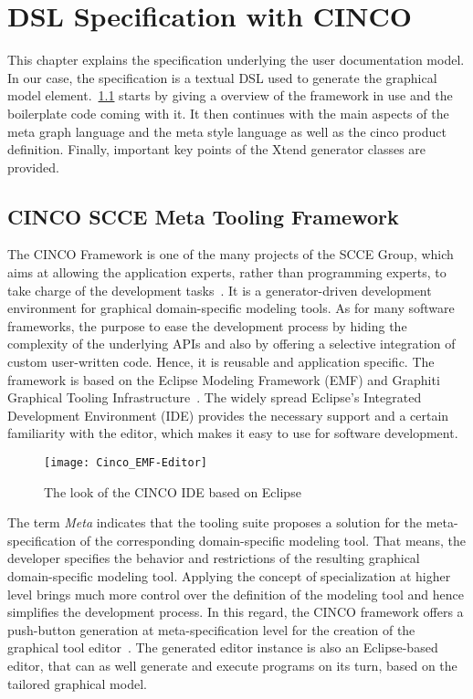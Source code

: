 
\chapter{DSL Specification with CINCO}\label{ch:DSL}

This chapter explains the specification underlying the user documentation model.  In our case, the specification is a textual DSL used to generate the graphical model element.~\ref{sec:CTF} starts by giving a overview of the framework in use and the boilerplate code coming with it. It then continues with the main aspects of the meta graph language and the meta style language as well as the cinco product definition. Finally, important key points of the Xtend generator classes are provided.

\section{CINCO SCCE Meta Tooling Framework}\label{sec:CTF}

The CINCO Framework is one of the many projects of the SCCE Group, which aims at allowing the application experts, rather than programming experts, to take charge of the development tasks~\cite{scce}. It is a generator-driven development environment for graphical domain-specific modeling tools. As for many software frameworks, the purpose to ease the development process by hiding the complexity of the underlying APIs and also by offering a selective integration of custom user-written code. Hence, it is reusable and application specific. The framework is based on the Eclipse Modeling Framework (EMF) and Graphiti Graphical Tooling Infrastructure~\cite{Cinco}. The widely spread Eclipse's Integrated Development Environment (IDE) provides the necessary support and a certain familiarity with the editor, which makes it easy to use for software development.
\begin{figure}[h]
    \texttt{[image: Cinco\_EMF-Editor]}
    \caption{The look of the CINCO IDE based on Eclipse}
\end{figure}

The term \textit{Meta} indicates that the tooling suite proposes a solution for the meta-specification of the corresponding domain-specific modeling tool. That means, the developer specifies the behavior and restrictions of the resulting graphical domain-specific modeling tool. Applying the concept of specialization at higher level brings much more control over the definition of the modeling tool and hence simplifies the development process. In this regard, the CINCO framework offers a push-button generation at meta-specification level for the creation of the graphical tool editor~\cite{scce}. The generated editor instance is also an Eclipse-based editor, that can as well generate and execute programs on its turn, based on the tailored graphical model.


